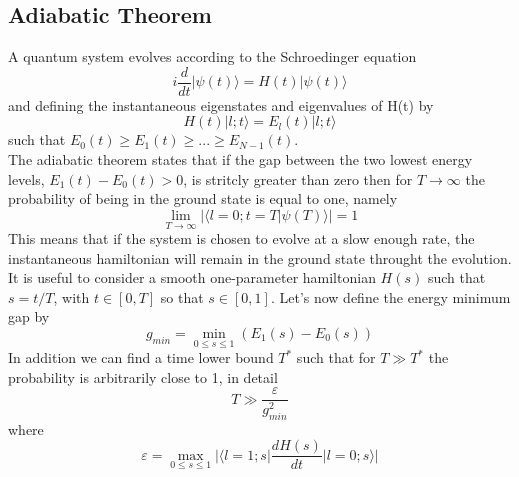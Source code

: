     \subsection{Adiabatic Theorem}
    A quantum system evolves according to the Schroedinger equation
    \begin{equation}
        i\frac{d}{dt}|\psi(t)\rangle = H(t)|\psi(t)\rangle
    \end{equation}
    and defining the instantaneous eigenstates and eigenvalues of H(t) by
    \begin{equation}
        H(t)|l;t\rangle = E_l(t)|l;t\rangle
    \end{equation}
    such that $E_0(t) \geq E_1(t) \geq ... \geq E_{N-1}(t)$. \\
    The adiabatic theorem states that if the gap between the two lowest energy levels, $E_{1}(t) - E_{0}(t) > 0$, is stritcly greater than zero then for $T\rightarrow \infty$ the probability of being in the ground state is equal to one, namely
    \begin{equation}
        \lim_{T \to \infty} |\langle l=0;t = T | \psi(T)\rangle| = 1
    \end{equation}
    This means that if the system is chosen to evolve at a slow enough rate, the instantaneous hamiltonian will remain in the ground state throught the evolution. It is useful to consider a smooth one-parameter hamiltonian $H(s)$ such that $s=t/T$, with $t \in [0,T]$ so that $s \in [0,1]$.
    Let's now define the energy minimum gap by
    \begin{equation}
        g_{min} = \min_{0 \leq s \leq 1} (E_1(s)-E_0(s))
    \end{equation}
    In addition we can find a time lower bound $T^*$ such that for $T\gg T^{*}$ the probability is arbitrarily close to 1, in detail
    \begin{equation}
        T \gg \frac{\varepsilon}{g^{2}_{min}}
    \end{equation}
    where
    \begin{equation}
        \varepsilon = \max_{0 \leq s \leq 1} \Big| \Big\langle l=1;s\Big| \frac{dH(s)}{dt} \Big| l=0;s\Big\rangle\Big|
    \end{equation}

